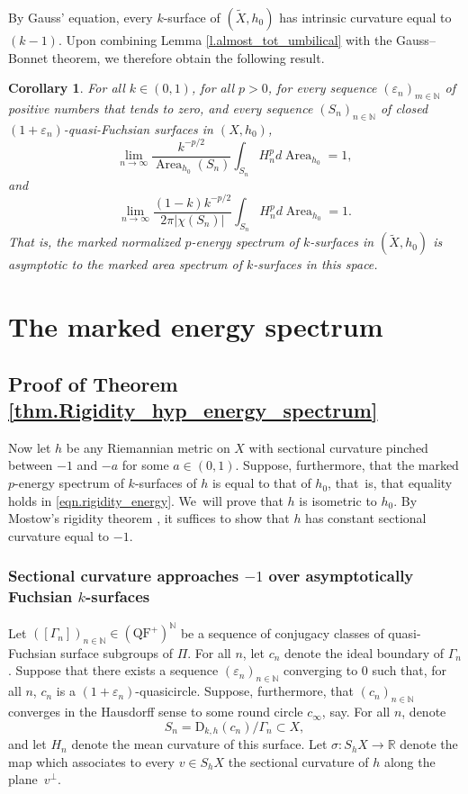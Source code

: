 \documentclass[11pt]{article}
\newcommand{\Subsubsection}{\subsubsection}
\newcommand{\ksurface}{$k$\nobreakdash-surface\xspace}
\newcommand{\ksurfaces}{$k$\nobreakdash-surfaces\xspace}
\theoremstyle{plain}
\newtheorem{corollary}[theorem]{Corollary}
\theoremstyle{definition}
\newcommand{\R}{{\mathbb R}}
\newcommand{\N}{{\mathbb N}}
\let\eps\varepsilon
\let\dans\subset
\newcommand{\QF}{\mathrm{QF}}
\newcommand{\rD}{\mathrm{D}}
\DeclareMathOperator{\Area}{Area}
\begin{document}
By Gauss' equation, every \ksurface of $(\tilde{X},h_0)$ has intrinsic curvature equal to $(k-1)$. Upon combining Lemma \ref{l.almost_tot_umbilical} with the Gauss--Bonnet theorem, we therefore obtain the following result.

\begin{corollary}{}\label{corollarouille}
For all $k\in(0,1)$, for all $p>0$, for every sequence $(\eps_n)_{m\in\N}$ of positive numbers that tends to zero, and every sequence $(S_n)_{n\in\N}$ of closed $(1+\eps_n)$-quasi-Fuchsian surfaces in $(X,h_0)$,
\begin{equation*}
\lim_{n\to\infty}\frac{k^{-p/2}}{\Area_{h_0}(S_n)}\int_{S_n} H_n^p d\Area_{h_0}=1,
\end{equation*}
and
\begin{equation*}
\lim_{n\to\infty}\frac{(1-k)k^{-p/2}}{2\pi|\chi(S_n)|}\int_{S_n} H_n^p d\Area_{h_0}=1.
\end{equation*}
That is, the marked normalized $p$-energy spectrum of \ksurfaces in $(\tilde{X},h_0)$ is asymptotic to the marked area spectrum of \ksurfaces in this space.
\end{corollary}

\section{The marked energy spectrum}

\subsection{Proof of Theorem \ref{thm.Rigidity_hyp_energy_spectrum}}\label{ss.Rigidity}
Now let $h$ be any Riemannian metric on $X$ with sectional curvature pinched between $-1$ and $-a$ for some $a\in(0,1)$. Suppose, furthermore, that the marked $p$-energy spectrum of \ksurfaces of $h$ is equal to that of $h_0$, that~is, that equality holds in \eqref{eqn.rigidity_energy}. We~will prove that $h$ is isometric to $h_0$. By Mostow's rigidity theorem \cite{Mostow}, it suffices to show that $h$ has constant sectional curvature equal to $-1$.

\Subsubsection{Sectional curvature approaches $-1$ over asymptotically Fuchsian \protect\ksurfaces}Let $([\Gamma_n])_{n\in\N}\in(\QF^+)^\N$ be a sequence of conjugacy classes of quasi-Fuchsian surface subgroups of $\Pi$. For all $n$, let $c_n$ denote the ideal boundary of $\Gamma_n$. Suppose that there exists a sequence $(\eps_n)_{n\in\N}$ converging to $0$ such that, for all $n$, $c_n$ is a $(1+\eps_n)$-quasicircle. Suppose, furthermore, that $(c_n)_{n\in\N}$ converges in the Hausdorff sense to some round circle $c_\infty$, say. For all $n$, denote
\begin{equation*}
S_n=\rD_{k,h}(c_n)/\Gamma_n\dans X,
\end{equation*}
and let $H_n$ denote the mean curvature of this surface. Let $\sigma:S_hX\to\R$ denote the map which associates to every $v\in S_hX$ the sectional curvature of $h$ along the plane~$v^\perp$.
\end{document}
